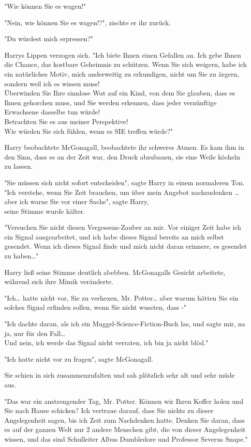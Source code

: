 {"Wie können Sie es wagen!"

"Nein, wie können Sie es wagen!?", zischte er ihr zurück.

"Du würdest mich erpressen?"

Harrys Lippen verzogen sich. "Ich biete Ihnen einen Gefallen an. Ich gebe Ihnen die Chance, das kostbare Geheimnis zu schützen. Wenn Sie sich weigern, habe ich ein natürliches Motiv, mich anderweitig zu erkundigen, nicht um Sie zu ärgern, sondern weil ich es wissen muss!\\ Überwinden Sie Ihre sinnlose Wut auf ein Kind, von dem Sie glauben, dass es Ihnen gehorchen muss, und Sie werden erkennen, dass jeder vernünftige Erwachsene dasselbe tun würde!\\ Betrachten Sie es aus meiner Perspektive!\\ Wie würden Sie sich fühlen, wenn es SIE treffen würde?"

Harry beobachtete McGonagall, beobachtete ihr schweres Atmen. Es kam ihm in den Sinn, dass es an der Zeit war, den Druck abzubauen, sie eine Weile köcheln zu lassen.

"Sie müssen sich nicht sofort entscheiden", sagte Harry in einem normaleren Ton. "Ich verstehe, wenn Sie Zeit brauchen, um über mein Angebot nachzudenken … aber ich warne Sie vor einer Sache", sagte Harry,\\ seine Stimme wurde kälter.

"Versuchen Sie nicht diesen Vergessens-Zauber an mir. Vor einiger Zeit habe ich ein Signal ausgearbeitet, und ich habe dieses Signal bereits an mich selbst gesendet. Wenn ich dieses Signal finde und mich nicht daran erinnere, es gesendet zu haben…"

Harry ließ seine Stimme deutlich abebben. McGonagalls Gesicht arbeitete, während sich ihre Mimik veränderte.

"Ich… hatte nicht vor, Sie zu verhexen, Mr. Potter… aber warum hätten Sie ein solches Signal erfinden sollen, wenn Sie nicht wussten, dass -"

"Ich dachte daran, als ich ein Muggel-Science-Fiction-Buch las, und sagte mir, na ja, nur für den Fall…\\ Und nein, ich werde das Signal nicht verraten, ich bin ja nicht blöd."

"Ich hatte nicht vor zu fragen", sagte McGonagall.

Sie schien in sich zusammenzufalten und sah plötzlich sehr alt und sehr müde aus.

"Das war ein anstrengender Tag, Mr. Potter. Können wir Ihren Koffer holen und Sie nach Hause schicken? Ich vertraue darauf, dass Sie nichts zu dieser Angelegenheit sagen, bis ich Zeit zum Nachdenken hatte. Denken Sie daran, dass es auf der ganzen Welt nur 2 andere Menschen gibt, die von dieser Angelegenheit wissen, und das sind Schulleiter Albus Dumbledore und Professor Severus Snape."

}
